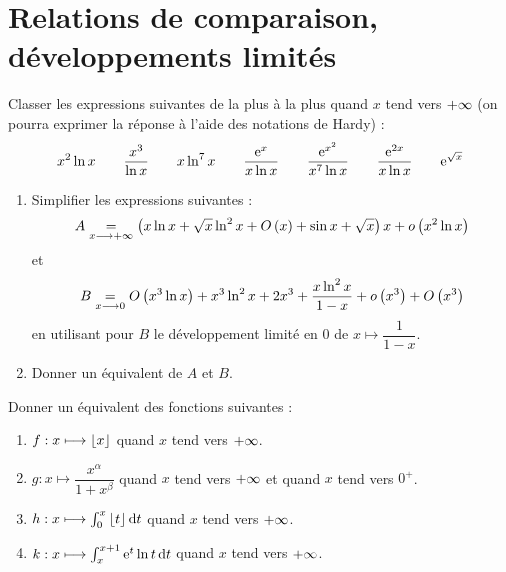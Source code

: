 \chapter{Relations de comparaison, développements limités}

\minitoc

\begin{exo}[Exercice 1]
Classer les expressions suivantes de la plus  à la plus  quand \(x\) tend vers \(+\infty\) (on pourra exprimer la réponse à l'aide des notations de Hardy) : \[x^2\ln x\qquad\dfrac{x^3}{\ln x}\qquad x\ln^7x\qquad\dfrac{\mathrm{e}^{x}}{x\ln x}\qquad\dfrac{\mathrm{e}^{x^2}}{x^7\ln x}\qquad\dfrac{\mathrm{e}^{2x}}{x\ln x}\qquad\mathrm{e}^{\sqrt{x}}\]
\end{exo}

\begin{corr}
\end{corr}

\begin{exo}[Exercice 2]
\begin{enumerate}
\item Simplifier les expressions suivantes : \[A\underset{x\longrightarrow+\infty}{=}\left(x\ln x+\sqrt{x}\ln^2x+O\left(x\right)+\sin x+\sqrt{x}\right)x+o\left(x^2\ln x\right)\] et \[B\underset{x\longrightarrow0}{=}O\left(x^3\ln x\right)+x^3\ln^2x+2x^3+\dfrac{x\ln^2x}{1-x}+o\left(x^3\right)+O\left(x^3\right)\] en utilisant pour \(B\) le développement limité en \(0\) de \(x\mapsto\dfrac{1}{1-x}\). \\

\item Donner un équivalent de \(A\) et \(B\).
\end{enumerate}
\end{exo}

\begin{corr}
\end{corr}

\begin{exo}[Exercice 3]
Donner un équivalent des fonctions suivantes :

\begin{enumerate}
\item \(f:x\longmapsto\left\lfloor x\right\rfloor\) quand \(x\) tend vers \(+\infty\). \\

\item \(g:x\mapsto\dfrac{x^{\alpha}}{1+x^{\beta}}\) quand \(x\) tend vers \(+\infty\) et quand \(x\) tend vers \(0^+\). \\

\item \(h:x\mapsto\int_0^x\floor{t}\odif{t}\) quand \(x\) tend vers \(+\infty\). \\

\item \(k:x\mapsto\int_x^{x+1}\e{t}\ln t\odif{t}\) quand \(x\) tend vers \(+\infty\).
\end{enumerate}
\end{exo}

